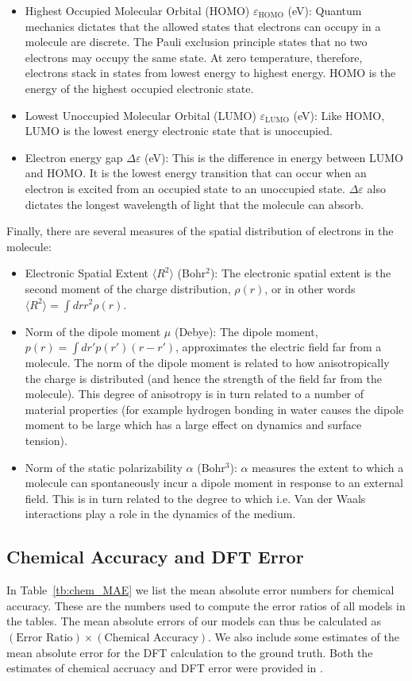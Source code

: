 \documentclass{article}
\begin{document}
\begin{itemize}
    \item Highest Occupied Molecular Orbital (HOMO) $\varepsilon_{\text{HOMO}}$ (eV): Quantum mechanics dictates that the allowed states that electrons can occupy in a molecule are discrete. The Pauli exclusion principle states that no two electrons may occupy the same state. At zero temperature, therefore, electrons stack in states from lowest energy to highest energy. HOMO is the energy of the highest occupied electronic state.
    \item Lowest Unoccupied Molecular Orbital (LUMO) $\varepsilon_{\text{LUMO}}$ (eV): Like HOMO, LUMO is the lowest energy electronic state that is unoccupied.
    \item Electron energy gap $\Delta\varepsilon$ (eV): This is the difference in energy between LUMO and HOMO. It is the lowest energy transition that can occur when an electron is excited from an occupied state to an unoccupied state. $\Delta\varepsilon$ also dictates the longest wavelength of light that the molecule can absorb.
\end{itemize}
Finally, there are several measures of the spatial distribution of electrons in the molecule:
\begin{itemize}
    \item Electronic Spatial Extent $\langle R^2\rangle$ (Bohr$^2$): The electronic spatial extent is the second moment of the charge distribution, $\rho(r)$, or in other words $\langle R^2\rangle = \int dr r^2\rho(r)$.
    \item Norm of the dipole moment $\mu$ (Debye): The dipole moment, $p(r) = \int dr'p(r')(r-r')$, approximates the electric field far from a molecule. The norm of the dipole moment is related to how anisotropically the charge is distributed (and hence the strength of the field far from the molecule). This degree of anisotropy is in turn related to a number of material properties (for example hydrogen bonding in water causes the dipole moment to be large which has a large effect on dynamics and surface tension).
    \item Norm of the static polarizability $\alpha$ (Bohr$^3$): $\alpha$ measures the extent to which a molecule can spontaneously incur a dipole moment in response to an external field. This is in turn related to the degree to which i.e. Van der Waals interactions play a role in the dynamics of the medium. 
\end{itemize}

\subsection{Chemical Accuracy and DFT Error}
    In Table~\ref{tb:chem_MAE} we list the mean absolute error numbers for chemical accuracy. These are the numbers used to compute the error ratios of all models in the tables. The mean absolute errors of our models can thus be calculated as $(\textrm{Error Ratio}) \times (\textrm{Chemical Accuracy})$. We also include some estimates of the mean absolute error for the DFT calculation to the ground truth. Both the estimates of chemical accruacy and DFT error were provided in \citet{colab}.
\end{document}
